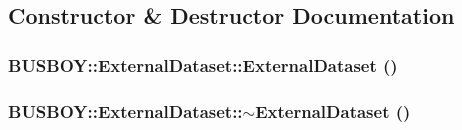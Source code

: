 \subsection{Constructor \& Destructor Documentation}
\hypertarget{classBUSBOY_1_1ExternalDataset_a5517ac1a6ea84a1593e94f801b90c589}{
\subsubsection[{ExternalDataset}]{\setlength{\rightskip}{0pt plus 5cm}BUSBOY::ExternalDataset::ExternalDataset ()}}
\label{classBUSBOY_1_1ExternalDataset_a5517ac1a6ea84a1593e94f801b90c589}
\hypertarget{classBUSBOY_1_1ExternalDataset_a17551ab8422fadcfc57ec0ebaab29ee6}{
\subsubsection[{$\sim$ExternalDataset}]{\setlength{\rightskip}{0pt plus 5cm}BUSBOY::ExternalDataset::$\sim$ExternalDataset ()}}
\label{classBUSBOY_1_1ExternalDataset_a17551ab8422fadcfc57ec0ebaab29ee6}


